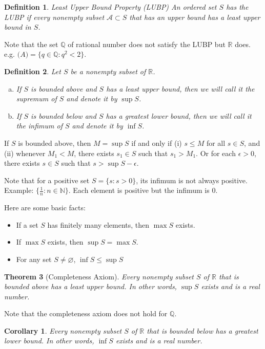 \documentclass[12pt, lettersize]{book}
\newtheorem{thm}{Theorem}[section]
\newtheorem{dfn}[thm]{Definition}
\newtheorem{cor}{Corollary}[thm]
\newcommand{\R}{\mathbb{R}}
\newcommand{\N}{\mathbb{N}}
\newcommand{\Q}{\mathbb{Q}}
\let\emptyset\varnothing
\begin{document}
		\begin{dfn}
		Least Upper Bound Property (LUBP)\newline
		An ordered set $S$ has the LUBP if every nonempty subset $\mathcal{A}\subset S$ that has an upper bound has a least upper bound in $S$.
		\end{dfn}
		Note that the set $\Q$ of rational number does not satisfy the LUBP but $\R$ does. e.g. $\mathcal(A)=\{q\in\Q: q^2<2\}$.
			
		\begin{dfn}\label{def:4.3}
		Let $S$ be a nonempty subset of $\R$.
		\begin{enumerate}[(a)]
			\item If $S$ is bounded above and $S$ has a least upper bound, then we will call it the \emph{supremum} of $S$ and denote it by $\sup S$.
			\item If $S$ is bounded below and $S$ has a greatest lower bound, then we will call it the \emph{infimum} of $S$ and denote it by $\inf S$.
		\end{enumerate}
		\end{dfn}
		If $S$ is bounded above, then $M=\sup S$ if and only if (i) $s\leq M$ for all $s\in S$, and (ii) whenever $M_1<M$, there exists $s_1\in S$ such that $s_1>M_1$. Or for each $\epsilon>0$, there exists $s\in S$ such that $s>\sup S-\epsilon$.
		
		Note that for a positive set $S=\{s: s>0\}$, its infimum is not always positive. Example: $\{\frac{1}{n}: n\in\N\}$. Each element is positive but the infimum is $0$.
		
		Here are some basic facts:
		\begin{itemize}
			\item If a set $S$ has finitely many elements, then $\max S$ exists.
			\item If $\max S$ exists, then $\sup S=\max S$.
			\item For any set $S\neq\emptyset$, $\inf S\leq \sup S$
		\end{itemize}
		
		\begin{thm}[Completeness Axiom]\label{thm:4.4}
		Every nonempty subset $S$ of $\R$ that is bounded above has a least upper bound. In other words, $\sup S$ exists and is a real number.
		\end{thm}
		Note that the completeness axiom does not hold for $\Q$. 
		\begin{cor}
		Every nonempty subset $S$ of $\R$ that is bounded below has a greatest lower bound. In other words, $\inf S$ exists and is a real number.
		\end{cor}
		
\end{document}
